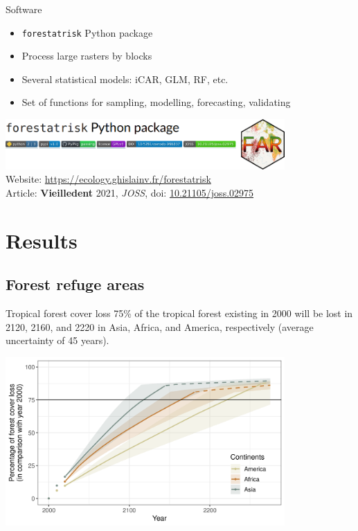 \documentclass[10pt,table,dvipsnames,compress]{beamer}
\begin{document}
\begin{frame}[label={sec:org8ca7df7},fragile]{Software}
 \begin{itemize}
\item \texttt{forestatrisk} Python package
\item Process large rasters by blocks
\item Several statistical models: iCAR, GLM, RF, etc.
\item Set of functions for sampling, modelling, forecasting, validating
\end{itemize}

\begin{center}
\includegraphics[width=0.8\textwidth]{figs/far-Python}\\
Website: \url{https://ecology.ghislainv.fr/forestatrisk}\\
Article: \textbf{Vieilledent} 2021, \emph{JOSS}, doi: \href{https://doi.org/10.21105/joss.02975}{10.21105/joss.02975}
\end{center}
\end{frame}

\section{Results}
\label{sec:org0026d3d}
\subsection{Forest refuge areas}
\label{sec:org2c4b0eb}
\begin{frame}[label={sec:orgc27eb72}]{Tropical forest cover loss}
\small
75\% of the tropical forest existing in 2000 will be lost in 2120, 2160,
and 2220 in Asia, Africa, and America, respectively (average uncertainty of \textpm{}45 years).

\centering \includegraphics[width=0.8\textwidth]{figs/article/perc_loss_cont}
\end{frame}
\end{document}
